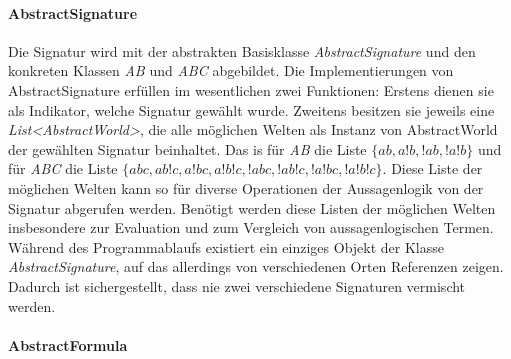\documentclass[12pt,a4paper]{article}
\begin{document}
\paragraph{AbstractSignature} \mbox{}

Die Signatur wird mit der abstrakten Basisklasse \textit{AbstractSignature} und den konkreten Klassen \textit{AB} und \textit{ABC} abgebildet. Die Implementierungen von AbstractSignature erfüllen im wesentlichen zwei Funktionen: Erstens dienen sie als Indikator, welche Signatur gewählt wurde. Zweitens besitzen sie jeweils eine \textit{List<AbstractWorld>}, die alle möglichen Welten als Instanz von AbstractWorld der gewählten Signatur beinhaltet. Das is für \textit{AB} die Liste $\{ab, a!b, !ab, !a!b\}$ und für \textit{ABC} die Liste $\{abc, ab!c, a!bc, a!b!c, !abc, !ab!c, !a!bc, !a!b!c\}$. Diese Liste der möglichen Welten kann so für diverse Operationen der Aussagenlogik von der Signatur abgerufen werden. Benötigt werden diese Listen der möglichen Welten insbesondere zur Evaluation und zum Vergleich von aussagenlogischen Termen. \\
Während des Programmablaufs existiert ein einziges Objekt der Klasse \textit{AbstractSignature}, auf das allerdings von verschiedenen Orten Referenzen zeigen. Dadurch ist sichergestellt, dass nie zwei verschiedene Signaturen vermischt werden.

\paragraph{AbstractFormula} \mbox{}
\end{document}
